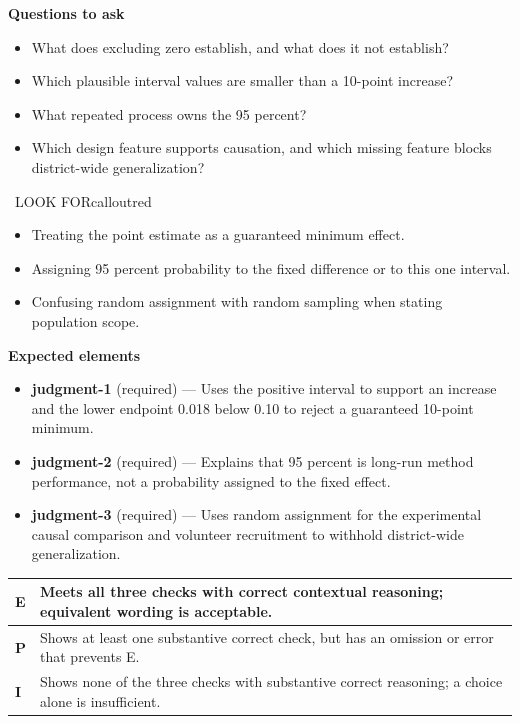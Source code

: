 \documentclass[11pt]{article}
\begin{document}
\textbf{Questions to ask}
\begin{itemize}[leftmargin=1.5em,itemsep=2pt,topsep=2pt]
  \item What does excluding zero establish, and what does it not establish?
  \item Which plausible interval values are smaller than a 10-point increase?
  \item What repeated process owns the 95 percent?
  \item Which design feature supports causation, and which missing feature blocks district-wide generalization?
\end{itemize}

\begin{callout}{\IconWarn\ LOOK FOR}{calloutred}
\begin{itemize}[leftmargin=1.5em,itemsep=2pt,topsep=2pt]
  \item Treating the point estimate as a guaranteed minimum effect.
  \item Assigning 95 percent probability to the fixed difference or to this one interval.
  \item Confusing random assignment with random sampling when stating population scope.
\end{itemize}
\end{callout}


\textbf{Expected elements}
\begin{itemize}[leftmargin=1.5em,itemsep=2pt,topsep=2pt]
  \item \textbf{judgment-1} (required) --- Uses the positive interval to support an increase and the lower endpoint 0.018 below 0.10 to reject a guaranteed 10-point minimum.
  \item \textbf{judgment-2} (required) --- Explains that 95 percent is long-run method performance, not a probability assigned to the fixed effect.
  \item \textbf{judgment-3} (required) --- Uses random assignment for the experimental causal comparison and volunteer recruitment to withhold district-wide generalization.
\end{itemize}

{\small\renewcommand{\arraystretch}{1.25}
\noindent\begin{tabular}{|p{0.5in}|p{5.9in}|}
\hline
\textbf{E} & Meets all three checks with correct contextual reasoning; equivalent wording is acceptable. \\ \hline
\textbf{P} & Shows at least one substantive correct check, but has an omission or error that prevents E. \\ \hline
\textbf{I} & Shows none of the three checks with substantive correct reasoning; a choice alone is insufficient. \\ \hline
\end{tabular}}
\end{document}
